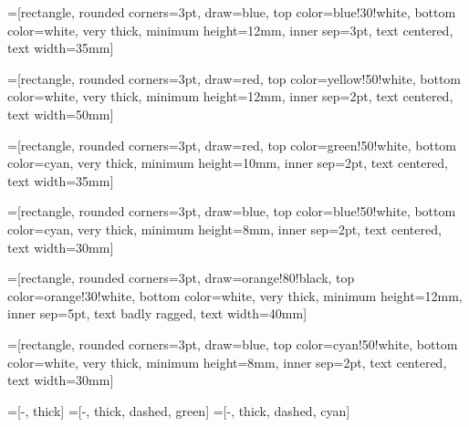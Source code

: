 
%
%

=[rectangle, rounded corners=3pt, draw=blue, top color=blue!30!white, bottom
color=white, very thick, minimum height=12mm, inner sep=3pt, text centered, text width=35mm]

=[rectangle, rounded corners=3pt, draw=red, top color=yellow!50!white, bottom
color=white, very thick, minimum height=12mm, inner sep=2pt, text centered, text width=50mm]

=[rectangle, rounded corners=3pt, draw=red, top color=green!50!white, bottom
color=cyan, very thick, minimum height=10mm, inner sep=2pt, text centered, text width=35mm]

=[rectangle, rounded corners=3pt, draw=blue, top color=blue!50!white, bottom
color=cyan, very thick, minimum height=8mm, inner sep=2pt, text centered, text width=30mm]

=[rectangle, rounded corners=3pt, draw=orange!80!black, top color=orange!30!white,
bottom color=white, very thick, minimum height=12mm, inner sep=5pt, text badly ragged, text width=40mm]

=[rectangle, rounded corners=3pt, draw=blue, top color=cyan!50!white, bottom
color=white, very thick, minimum height=8mm, inner sep=2pt, text centered, text width=30mm]

=[-, thick]
=[-, thick, dashed, green]
=[-, thick, dashed, cyan]


